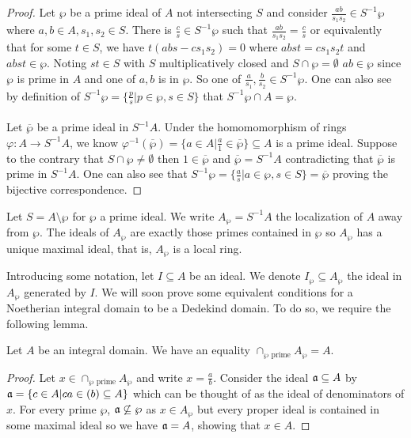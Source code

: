 \begin{proof}
  Let $\wp$ be a prime ideal of $A$ not intersecting $S$ and consider $\frac{ab}{s_{1}s_{2}}\in S^{-1}\wp$ where $a,b\in A, s_{1},s_{2}\in S$. There is $\frac{c}{s}\in S^{-1}\wp$ such that $\frac{ab}{s_{1}s_{2}}=\frac{c}{s}$ or equivalently that for some $t\in S$, we have $t(abs-cs_{1}s_{2})=0$ where $abst = cs_{1}s_{2}t$ and $abst\in\wp$. Noting $st\in S$ with $S$ multiplicatively closed and $S\cap\wp=\emptyset$ $ab\in\wp$ since $\wp$ is prime in $A$ and one of $a,b$ is in $\wp$. So one of $\frac{a}{s_{1}},\frac{b}{s_{2}}\in S^{-1}\wp$. One can also see by definition of $S^{-1}\wp=\{\frac{p}{s}|p\in\wp,s\in S\}$ that $S^{-1}\wp\cap A=\wp$. 
  \\\\
  Let $\overline{\wp}$ be a prime ideal in $S^{-1}A$. Under the homomomorphism of rings $\varphi:A\to S^{-1}A$, we know $\varphi^{-1}(\overline{\wp})=\{a\in A|\frac{a}{1}\in\overline{\wp}\}\subseteq A$ is a prime ideal. Suppose to the contrary that $S\cap\wp\neq\emptyset$ then $1\in\overline{\wp}$ and $\overline{\wp}=S^{-1}A$ contradicting that $\overline{\wp}$ is prime in $S^{-1}A$. One can also see that $S^{-1}\wp=\{\frac{a}{s}|a\in\wp,s\in S\}=\overline{\wp}$ proving the bijective correspondence. 
\end{proof}
\begin{example}
  Let $S=A\setminus\wp$ for $\wp$ a prime ideal. We write $A_{\wp}=S^{-1}A$ the localization of $A$ away from $\wp$. The ideals of $A_{\wp}$ are exactly those primes contained in $\wp$ so $A_{\wp}$ has a unique maximal ideal, that is, $A_{\wp}$ is a local ring. 
\end{example}
Introducing some notation, let $I\subseteq A$ be an ideal. We denote $I_{\wp}\subseteq A_{\wp}$ the ideal in $A_{\wp}$ generated by $I$. We will soon prove some equivalent conditions for a Noetherian integral domain to be a Dedekind domain. To do so, we require the following lemma. 
\begin{lemma}\label{lem:intersection of prime ideals}
  Let $A$ be an integral domain. We have an equality $\cap_{\wp\text{ prime}}A_{\wp}=A$. 
\end{lemma}
\begin{proof}
  Let $x\in\cap_{\wp\text{ prime}}A_{\wp}$ and write $x=\frac{a}{b}$. Consider the ideal $\mathfrak{a}\subseteq A$ by $\mathfrak{a}=\{c\in A|ca\in(b)\subseteq A\}$ which can be thought of as the ideal of denominators of $x$. For every prime $\wp$, $\mathfrak{a}\not\subseteq\wp$ as $x\in A_{\wp}$ but every proper ideal is contained in some maximal ideal so we have $\mathfrak{a}=A$, showing that $x\in A$. 
\end{proof}
